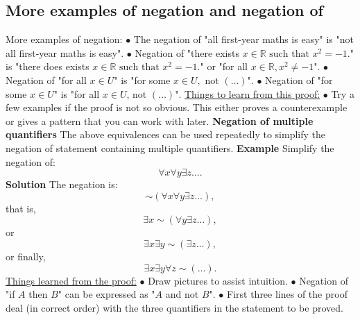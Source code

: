 \documentclass{article}
\begin{document}
\subsection{More examples of negation and negation of}
More examples of negation:
\newline
\newline
$\bullet $ The negation of "all first-year maths is easy" is "not all first-year maths is easy".
\newline
$\bullet $ Negation of "there exists $x \in \mathbb{R} \text{ such that }x^2 = -1.$" is "there does exists $x \in \mathbb{R} \text{ such that }x^2 = -1.$" or "for all $x \in \mathbb{R}, x^2 \not = -1$".
\newline
$\bullet $ Negation of "for all $x \in U$" is "for some $x \in U, \text{ not } (\dots)$". 
\newline
$\bullet $ Negation of "for some $x \in U$" is "for all $x \in U$, not $( \dots )$".
\newline
{}
\newline
{}
\newline
\newline
\underline{Things to learn from this proof:}
\newline
\newline
$\bullet $ Try a few examples if the proof is not so obvious. This either proves a counterexample or gives a pattern that you can work with later.
\newline
\newline
\textbf{Negation of multiple quantifiers } The above equivalences can be used repeatedly to simplify the negation of statement containing multiple quantifiers. 
\newline
\newline
\textbf{Example } Simplify the negation of:
$$\forall x \forall y \exists z \dots.$$
\textbf{Solution } The negation is:
$$\sim (\forall x \forall y \exists z \dots ),$$
that is,
$$\exists x \sim(\forall y \exists z \dots),$$
or
$$\exists x \exists y \sim(\exists z \dots),$$
or finally,
$$\exists x \exists y \forall z \sim(\dots).$$
\newline
{}
\newline
\newline
\underline{Things learned from the proof:}
\newline
$\bullet $ Draw pictures to assist intuition.
\newline
$\bullet $ Negation of "if $A$ then $B$" can be expressed as "$A$ and not $B$".
\newline
$\bullet $ First three lines of the proof deal (in correct order) with the three quantifiers in the statement to be proved.
\newpage
\end{document}
